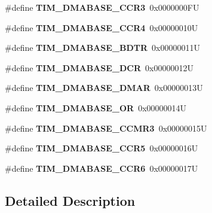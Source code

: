 \begin{DoxyCompactItemize}
\#define {\bfseries T\+I\+M\+\_\+\+D\+M\+A\+B\+A\+S\+E\+\_\+\+C\+C\+R3}~0x0000000\+FU
\item 
\mbox{\label{group___t_i_m___d_m_a___base__address_gaea24fd3f528163da065cbdce3c68ef23}} 
\#define {\bfseries T\+I\+M\+\_\+\+D\+M\+A\+B\+A\+S\+E\+\_\+\+C\+C\+R4}~0x00000010U
\item 
\mbox{\label{group___t_i_m___d_m_a___base__address_ga767eab033d485d32de80b46f70be3341}} 
\#define {\bfseries T\+I\+M\+\_\+\+D\+M\+A\+B\+A\+S\+E\+\_\+\+B\+D\+TR}~0x00000011U
\item 
\mbox{\label{group___t_i_m___d_m_a___base__address_gab3e5aaf0cb815b4a2469d3046eca0201}} 
\#define {\bfseries T\+I\+M\+\_\+\+D\+M\+A\+B\+A\+S\+E\+\_\+\+D\+CR}~0x00000012U
\item 
\mbox{\label{group___t_i_m___d_m_a___base__address_gafc79c60f0295d440ba3ed3bb3c73c739}} 
\#define {\bfseries T\+I\+M\+\_\+\+D\+M\+A\+B\+A\+S\+E\+\_\+\+D\+M\+AR}~0x00000013U
\item 
\mbox{\label{group___t_i_m___d_m_a___base__address_ga4b50ac8b63d27e309695ba36643bc1d0}} 
\#define {\bfseries T\+I\+M\+\_\+\+D\+M\+A\+B\+A\+S\+E\+\_\+\+OR}~0x00000014U
\item 
\mbox{\label{group___t_i_m___d_m_a___base__address_ga48a6df471e6a42271b3c6ef7072204ea}} 
\#define {\bfseries T\+I\+M\+\_\+\+D\+M\+A\+B\+A\+S\+E\+\_\+\+C\+C\+M\+R3}~0x00000015U
\item 
\mbox{\label{group___t_i_m___d_m_a___base__address_ga219e3fff69fa9b9d564fa4d604072be8}} 
\#define {\bfseries T\+I\+M\+\_\+\+D\+M\+A\+B\+A\+S\+E\+\_\+\+C\+C\+R5}~0x00000016U
\item 
\mbox{\label{group___t_i_m___d_m_a___base__address_ga8cf977b2548574072f45cfd7eca6b5c5}} 
\#define {\bfseries T\+I\+M\+\_\+\+D\+M\+A\+B\+A\+S\+E\+\_\+\+C\+C\+R6}~0x00000017U
\end{DoxyCompactItemize}


\subsection{Detailed Description}
